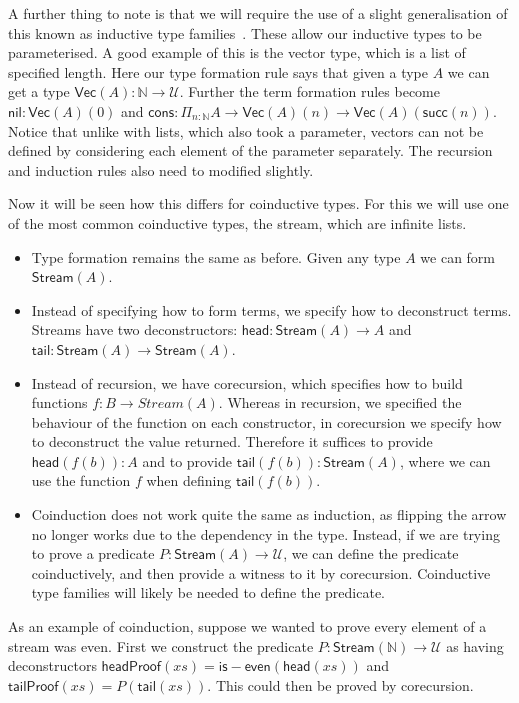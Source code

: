 \documentclass{article}
\theoremstyle{definition}
\theoremstyle{remark}
\begin{document}
A further thing to note is that we will require the use of a slight generalisation of this known as inductive type families~\cite[Section 5.7]{hottbook}. These allow our inductive types to be parameterised. A good example of this is the vector type, which is a list of specified length. Here our type formation rule says that given a type \(A\) we can get a type \(\mathsf{Vec}(A) : \mathbb{N} \to \mathcal{U}\). Further the term formation rules become \(\mathsf{nil} : \mathsf{Vec}(A)(0)\) and \(\mathsf{cons} : \Pi_{n : \mathbb{N}} A \to \mathsf{Vec}(A)(n) \to \mathsf{Vec}(A)(\mathsf{succ}(n))\). Notice that unlike with lists, which also took a parameter, vectors can not be defined by considering each element of the parameter separately. The recursion and induction rules also need to modified slightly.

Now it will be seen how this differs for coinductive types. For this we will use one of the most common coinductive types, the stream, which are infinite lists.

\begin{itemize}
\item Type formation remains the same as before. Given any type \(A\) we can form \(\mathsf{Stream}(A)\).
\item Instead of specifying how to form terms, we specify how to deconstruct terms. Streams have two deconstructors: \(\mathsf{head} : \mathsf{Stream}(A) \to A\) and \(\mathsf{tail} : \mathsf{Stream}(A) \to \mathsf{Stream}(A)\).
\item Instead of recursion, we have corecursion, which specifies how to build functions \(f : B \to Stream(A)\). Whereas in recursion, we specified the behaviour of the function on each constructor, in corecursion we specify how to deconstruct the value returned. Therefore it suffices to provide \(\mathsf{head}(f(b)) : A\) and to provide \(\mathsf{tail}(f(b)) : \mathsf{Stream}(A)\), where we can use the function \(f\) when defining \(\mathsf{tail}(f(b))\).
\item Coinduction does not work quite the same as induction, as flipping the arrow no longer works due to the dependency in the type. Instead, if we are trying to prove a predicate \(P : \mathsf{Stream}(A) \to \mathcal{U}\), we can define the predicate coinductively, and then provide a witness to it by corecursion. Coinductive type families will likely be needed to define the predicate.
\end{itemize}

As an example of coinduction, suppose we wanted to prove every element of a stream was even. First we construct the predicate \(P : \mathsf{Stream}(\mathbb{N}) \to \mathcal{U}\) as having deconstructors \(\mathsf{headProof}(xs) = \mathsf{is-even}(\mathsf{head}(xs))\) and \(\mathsf{tailProof}(xs) = P(\mathsf{tail}(xs))\). This could then be proved by corecursion.
\end{document}
